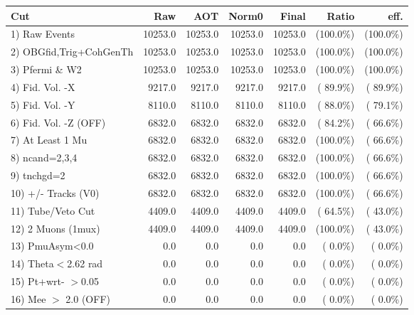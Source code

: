  \begin{table}[h!]\centering
 \begin{tabular}{||l||r|r|r|r|r|r||}
 \hline
 \hline
 Cut & Raw & AOT & Norm0 & Final & Ratio & eff.       \\
 \hline
  1) Raw Events           &      10253.0 &      10253.0 &      10253.0 &      10253.0 & (100.0\%) & (100.0\%) \\
  2) OBGfid,Trig+CohGenTh &      10253.0 &      10253.0 &      10253.0 &      10253.0 & (100.0\%) & (100.0\%) \\
  3) Pfermi \& W2         &      10253.0 &      10253.0 &      10253.0 &      10253.0 & (100.0\%) & (100.0\%) \\
  4) Fid. Vol. -X         &       9217.0 &       9217.0 &       9217.0 &       9217.0 & ( 89.9\%) & ( 89.9\%) \\
  5) Fid. Vol. -Y         &       8110.0 &       8110.0 &       8110.0 &       8110.0 & ( 88.0\%) & ( 79.1\%) \\
  6) Fid. Vol. -Z (OFF)   &       6832.0 &       6832.0 &       6832.0 &       6832.0 & ( 84.2\%) & ( 66.6\%) \\
  7) At Least 1 Mu        &       6832.0 &       6832.0 &       6832.0 &       6832.0 & (100.0\%) & ( 66.6\%) \\
  8) ncand=2,3,4          &       6832.0 &       6832.0 &       6832.0 &       6832.0 & (100.0\%) & ( 66.6\%) \\
  9) tnchgd=2             &       6832.0 &       6832.0 &       6832.0 &       6832.0 & (100.0\%) & ( 66.6\%) \\
 10) +/- Tracks (V0)      &       6832.0 &       6832.0 &       6832.0 &       6832.0 & (100.0\%) & ( 66.6\%) \\
 11) Tube/Veto Cut        &       4409.0 &       4409.0 &       4409.0 &       4409.0 & ( 64.5\%) & ( 43.0\%) \\
 12) 2 Muons (1mux)       &       4409.0 &       4409.0 &       4409.0 &       4409.0 & (100.0\%) & ( 43.0\%) \\
 13) PmuAsym<0.0          &          0.0 &          0.0 &          0.0 &          0.0 & (  0.0\%) & (  0.0\%) \\
 14) Theta$<$2.62 rad     &          0.0 &          0.0 &          0.0 &          0.0 & (  0.0\%) & (  0.0\%) \\
 15) Pt+wrt- $>$0.05      &          0.0 &          0.0 &          0.0 &          0.0 & (  0.0\%) & (  0.0\%) \\
 16) Mee $>$ 2.0  (OFF)   &          0.0 &          0.0 &          0.0 &          0.0 & (  0.0\%) & (  0.0\%) \\

\end{tabular}
\end{table}
